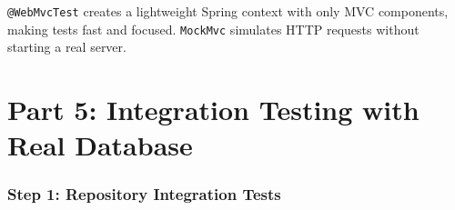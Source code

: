 \documentclass[12pt,a4paper]{article}
\begin{document}
\begin{tipbox}
\texttt{@WebMvcTest} creates a lightweight Spring context with only MVC components, making tests fast and focused. \texttt{MockMvc} simulates HTTP requests without starting a real server.
\end{tipbox}

\newpage

\part{Part 5: Integration Testing with Real Database}

\section{Step 1: Repository Integration Tests}
\end{document}
